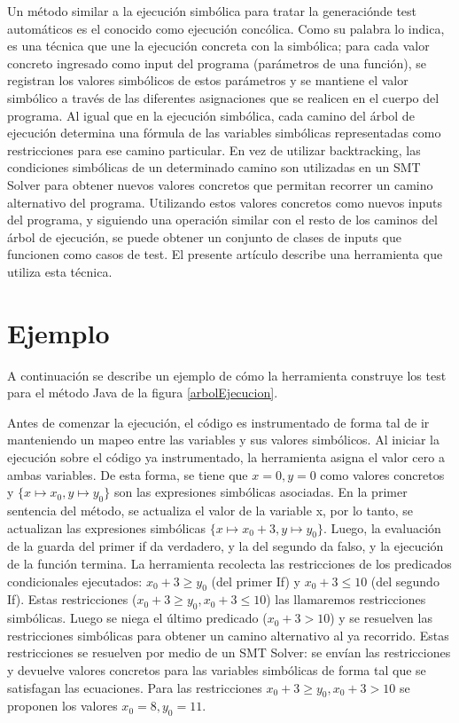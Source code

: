 \documentclass{llncs}
\begin{document}
Un método similar a la ejecución simbólica para tratar la generaciónde test automáticos es el conocido como ejecución concólica. Como su palabra lo indica, es una técnica que une la
ejecución concreta con la simbólica; para cada valor concreto ingresado como input del programa (parámetros de una función), se registran los valores simbólicos de estos parámetros y
se mantiene el valor simbólico a través de las diferentes asignaciones que se realicen en el cuerpo del programa. Al igual que en la ejecución simbólica, cada camino del árbol de
ejecución determina una fórmula de las variables simbólicas representadas como restricciones para ese camino particular. En vez de utilizar backtracking,
las condiciones simbólicas de un determinado camino son utilizadas en un SMT Solver para obtener nuevos valores concretos que permitan recorrer un camino alternativo del programa.
Utilizando estos valores concretos como nuevos inputs del programa, y siguiendo una operación similar con el resto de los caminos del árbol de ejecución, se puede obtener un conjunto
de clases de inputs que funcionen como casos de test. El presente artículo describe una herramienta que utiliza esta técnica.


\section{Ejemplo}
A continuación se describe un ejemplo de cómo la herramienta construye los test para el método Java de la figura \ref{arbolEjecucion}.

Antes de comenzar la ejecución, el código es instrumentado de forma tal de ir manteniendo un mapeo entre las variables y sus valores simbólicos. Al iniciar la ejecución sobre el
código ya instrumentado, la herramienta asigna el valor cero a ambas variables. De esta forma, se tiene que $x=0, y=0$ como valores concretos y \(\{x\mapsto x_0,y\mapsto y_0\}\)
son las expresiones simbólicas asociadas. En la primer sentencia del método, se actualiza el valor de la variable x, por lo tanto, se actualizan las expresiones simbólicas
\(\{x\mapsto x_0+3,y\mapsto y_0\}\). Luego, la evaluación de la guarda del primer if da verdadero, y la del segundo da falso, y la ejecución de la función termina.
La herramienta recolecta las restricciones de los predicados condicionales ejecutados: $x_0+3 \geq y_0$ (del primer If) y $x_0+3 \leq 10$ (del segundo If).
Estas restricciones ($x_0+3 \geq y_0, x_0+3 \leq 10$) las llamaremos restricciones simbólicas. Luego se niega el último predicado ($x_0+3 > 10$) y se resuelven las restricciones
simbólicas para obtener un camino alternativo al ya recorrido. Estas restricciones se resuelven por medio de un SMT Solver: se envían las restricciones y devuelve valores
concretos para las variables simbólicas de forma tal que se satisfagan las ecuaciones. Para las restricciones $x_0+3 \geq y_0, x_0+3 > 10$ se proponen los valores $x_0 = 8, y_0 = 11$.
\end{document}
